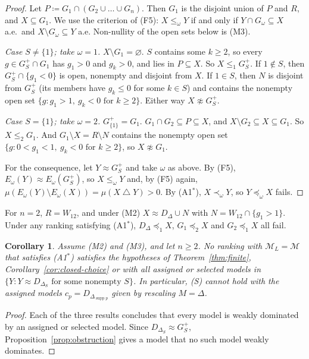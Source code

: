 \documentclass[11pt]{article}
\newtheorem{corollary}[theorem]{Corollary}
\theoremstyle{definition}
\newcommand{\supp}{\operatorname{supp}}
\newcommand{\Mc}{\mathcal M}
\newcommand{\sd}{\mathbin{\triangle}}
\begin{document}
\begin{proof}
Let $P\coloneqq G_1\cap(G_2\cup\dots\cup G_n)$. Then $G_1$ is the disjoint union of $P$ and $R$, and $X\subseteq G_1$. We use the criterion of (F5): $X\le_\omega Y$ if and only if $Y\cap G_\omega\subseteq X$ a.e.\ and $X\setminus G_\omega\subseteq Y$ a.e. Non-nullity of the open sets below is (M3).

\emph{Case $S\ne\{1\}$; take $\omega=1$.} $X\setminus G_1=\varnothing$. $S$ contains some $k\ge2$, so every $g\in G_S^+\cap G_1$ has $g_1>0$ and $g_k>0$, and lies in $P\subseteq X$. So $X\le_1G_S^+$. If $1\notin S$, then $G_S^+\cap\{g_1<0\}$ is open, nonempty and disjoint from $X$. If $1\in S$, then $N$ is disjoint from $G_S^+$ (its members have $g_k\le0$ for some $k\in S$) and contains the nonempty open set $\{g:g_1>1,\ g_k<0\text{ for }k\ge2\}$. Either way $X\not\approx G_S^+$.

\emph{Case $S=\{1\}$; take $\omega=2$.} $G_{\{1\}}^+=G_1$. $G_1\cap G_2\subseteq P\subseteq X$, and $X\setminus G_2\subseteq X\subseteq G_1$. So $X\le_2G_1$. And $G_1\setminus X=R\setminus N$ contains the nonempty open set $\{g:0<g_1<1,\ g_k<0\text{ for }k\ge2\}$, so $X\not\approx G_1$.

For the consequence, let $Y\approx G_S^+$ and take $\omega$ as above. By (F5), $E_\omega(Y)\approx E_\omega(G_S^+)$, so $X\le_\omega Y$ and, by (F5) again, $\mu(E_\omega(Y)\setminus E_\omega(X))=\mu(X\sd Y)>0$. By (A1$^*$), $X\prec_\omega Y$, so $Y\preceq_\omega X$ fails.
\end{proof}

For $n=2$, $R=W_{12}$, and under (M2) $X\approx D_\Delta\cup N$ with $N=W_{12}\cap\{g_1>1\}$. Under any ranking satisfying (A1$^*$), $D_\Delta\preceq_1X$, $G_1\preceq_2X$ and $G_2\preceq_1X$ all fail.

\begin{corollary}\label{cor:obstruction}
Assume (M2) and (M3), and let $n\ge2$. No ranking with $\Mc_L=\Mc$ that satisfies (A1$^*$) satisfies the hypotheses of Theorem~\ref{thm:finite}, Corollary~\ref{cor:closed-choice} or \cite[Theorem~2.4]{LDG} with all assigned or selected models in $\{Y:Y\approx D_{\Delta_S}\text{ for some nonempty }S\}$. In particular, (S) cannot hold with the assigned models $c_p=D_{\Delta_{\supp p}}$ given by rescaling $M=\Delta$.
\end{corollary}

\begin{proof}
Each of the three results concludes that every model is weakly dominated by an assigned or selected model. Since $D_{\Delta_S}\approx G_S^+$, Proposition~\ref{prop:obstruction} gives a model that no such model weakly dominates.
\end{proof}
\end{document}
